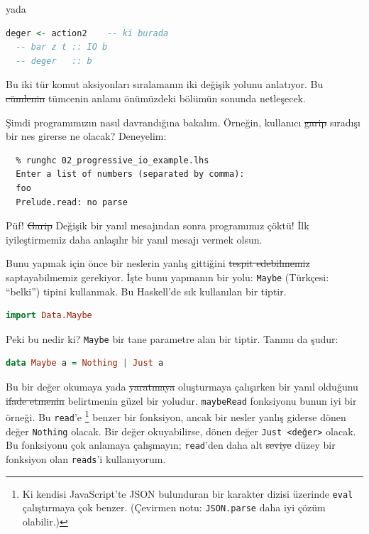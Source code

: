 \documentclass[a4paper,14pt,openany]{extbook} %
\begin{document}
yada

\begin{lstlisting}[language=Haskell]
  deger <- action2    -- ki burada
  -- bar z t :: IO b
  -- deger   :: b
\end{lstlisting}

Bu iki tür komut aksiyonları sıralamanın iki değişik yolunu anlatıyor.
Bu \st{cümlenin} tümcenin anlamı önümüzdeki bölümün sonunda netleşecek.

Şimdi programımızın nasıl davrandığına bakalım. Örneğin, kullanıcı
\st{garip} sıradışı bir nes girerse ne olacak? Deneyelim:

\begin{lstlisting}
  % runghc 02_progressive_io_example.lhs
  Enter a list of numbers (separated by comma):
  foo
  Prelude.read: no parse
\end{lstlisting}

Püf! \st{Garip} Değişik bir yanıl mesajından sonra programımız çöktü! İlk
iyileştirmemiz daha anlaşılır bir yanıl mesajı vermek olsun.

Bunu yapmak için önce bir neslerin yanlış gittiğini \st{tespit edebilmemiz}
saptayabilmemiz
gerekiyor. İşte bunu yapmanın bir yolu: \lstinline!Maybe! (Türkçesi:
``belki'') tipini kullanmak. Bu Haskell'de sık kullanılan bir tiptir.

\begin{lstlisting}[language=Haskell]
  import Data.Maybe
\end{lstlisting}

Peki bu nedir ki? \lstinline!Maybe! bir tane parametre alan bir tiptir.
Tanımı da şudur:

\begin{lstlisting}[language=Haskell]
  data Maybe a = Nothing | Just a
\end{lstlisting}

Bu bir değer okumaya yada \st{yaratmaya} oluşturmaya çalışırken bir yanıl olduğunu
\st{ifade etmenin} belirtmenin güzel bir yoludur. \lstinline!maybeRead! fonksiyonu bunun iyi
bir örneği. Bu \lstinline!read!'e \footnote{Ki kendisi JavaScript'te
  JSON bulunduran bir karakter dizisi üzerinde \lstinline!eval!
  çalıştırmaya çok benzer. (Çevirmen notu: \lstinline!JSON.parse! daha
  iyi çözüm olabilir.)} benzer bir fonksiyon, ancak bir nesler yanlış
giderse dönen değer \lstinline!Nothing! olacak. Bir değer
okuyabilirse, dönen değer \lstinline!Just <değer>! olacak. Bu fonksiyonu
çok anlamaya çalışmayın; \lstinline!read!'den daha alt \st{seviye} düzey bir
fonksiyon olan \lstinline!reads!'i kullanıyorum.
\end{document}
